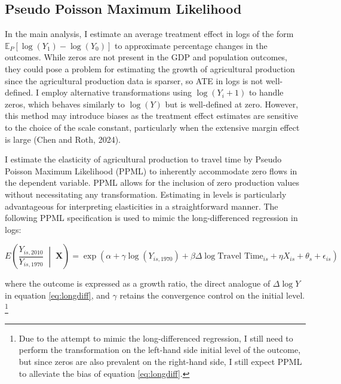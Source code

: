 \documentclass[11pt]{article}
\begin{document}
\subsection{Pseudo Poisson Maximum Likelihood}

In the main analysis, I estimate an average treatment effect in logs of the form $\mathbb{E}_P[\log(Y_1)-\log(Y_0)]$ to approximate percentage changes in the outcomes. While zeros are not present in the GDP and population outcomes, they could pose a problem for estimating the growth of agricultural production since the agricultural production data is sparser, so ATE in logs is not well-defined. I employ alternative transformations using $\log(Y_i+1)$ to handle zeros, which behaves similarly to $\log(Y)$ but is well-defined at zero. However, this method may introduce biases as the treatment effect estimates are sensitive to the choice of the scale constant, particularly when the extensive margin effect is large (Chen and Roth, 2024). 

I estimate the elasticity of agricultural production to travel time by Pseudo Poisson Maximum Likelihood (PPML) to inherently accommodate zero flows in the dependent variable. PPML allows for the inclusion of zero production values without necessitating any transformation. Estimating in levels is particularly advantageous for interpreting elasticities in a straightforward manner. The following PPML specification is used to mimic the long-differenced regression in logs:

\begin{equation}
    E\!\left(\frac{Y_{is, 2010}}{Y_{is, 1970}} \;\middle|\; \boldsymbol{X}\right) = \exp\left(\alpha + \gamma \log(Y_{is, 1970}) + \beta \Delta \log \text{Travel Time}_{is} + \eta X_{is} + \theta_s + \epsilon_{is}\right)
    \label{eq:ppml}
\end{equation}

where the outcome is expressed as a growth ratio, the direct analogue of $\Delta \log Y$ in equation \eqref{eq:longdiff}, and $\gamma$ retains the convergence control on the initial level. \footnote{Due to the attempt to mimic the long-differenced regression, I still need to perform the transformation on the left-hand side initial level of the outcome, but since zeros are also prevalent on the right-hand side, I still expect PPML to alleviate the bias of equation \eqref{eq:longdiff}.}
\end{document}
